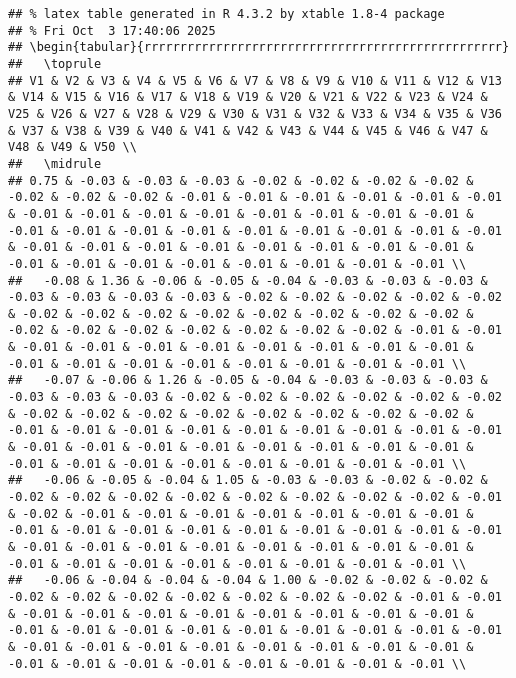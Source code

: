 \documentclass[
]{article}
\begin{document}
\begin{verbatim}
## % latex table generated in R 4.3.2 by xtable 1.8-4 package
## % Fri Oct  3 17:40:06 2025
## \begin{tabular}{rrrrrrrrrrrrrrrrrrrrrrrrrrrrrrrrrrrrrrrrrrrrrrrrrr}
##   \toprule
## V1 & V2 & V3 & V4 & V5 & V6 & V7 & V8 & V9 & V10 & V11 & V12 & V13 & V14 & V15 & V16 & V17 & V18 & V19 & V20 & V21 & V22 & V23 & V24 & V25 & V26 & V27 & V28 & V29 & V30 & V31 & V32 & V33 & V34 & V35 & V36 & V37 & V38 & V39 & V40 & V41 & V42 & V43 & V44 & V45 & V46 & V47 & V48 & V49 & V50 \\ 
##   \midrule
## 0.75 & -0.03 & -0.03 & -0.03 & -0.02 & -0.02 & -0.02 & -0.02 & -0.02 & -0.02 & -0.02 & -0.01 & -0.01 & -0.01 & -0.01 & -0.01 & -0.01 & -0.01 & -0.01 & -0.01 & -0.01 & -0.01 & -0.01 & -0.01 & -0.01 & -0.01 & -0.01 & -0.01 & -0.01 & -0.01 & -0.01 & -0.01 & -0.01 & -0.01 & -0.01 & -0.01 & -0.01 & -0.01 & -0.01 & -0.01 & -0.01 & -0.01 & -0.01 & -0.01 & -0.01 & -0.01 & -0.01 & -0.01 & -0.01 & -0.01 \\ 
##   -0.08 & 1.36 & -0.06 & -0.05 & -0.04 & -0.03 & -0.03 & -0.03 & -0.03 & -0.03 & -0.03 & -0.03 & -0.02 & -0.02 & -0.02 & -0.02 & -0.02 & -0.02 & -0.02 & -0.02 & -0.02 & -0.02 & -0.02 & -0.02 & -0.02 & -0.02 & -0.02 & -0.02 & -0.02 & -0.02 & -0.02 & -0.02 & -0.01 & -0.01 & -0.01 & -0.01 & -0.01 & -0.01 & -0.01 & -0.01 & -0.01 & -0.01 & -0.01 & -0.01 & -0.01 & -0.01 & -0.01 & -0.01 & -0.01 & -0.01 \\ 
##   -0.07 & -0.06 & 1.26 & -0.05 & -0.04 & -0.03 & -0.03 & -0.03 & -0.03 & -0.03 & -0.03 & -0.02 & -0.02 & -0.02 & -0.02 & -0.02 & -0.02 & -0.02 & -0.02 & -0.02 & -0.02 & -0.02 & -0.02 & -0.02 & -0.02 & -0.01 & -0.01 & -0.01 & -0.01 & -0.01 & -0.01 & -0.01 & -0.01 & -0.01 & -0.01 & -0.01 & -0.01 & -0.01 & -0.01 & -0.01 & -0.01 & -0.01 & -0.01 & -0.01 & -0.01 & -0.01 & -0.01 & -0.01 & -0.01 & -0.01 \\ 
##   -0.06 & -0.05 & -0.04 & 1.05 & -0.03 & -0.03 & -0.02 & -0.02 & -0.02 & -0.02 & -0.02 & -0.02 & -0.02 & -0.02 & -0.02 & -0.02 & -0.01 & -0.02 & -0.01 & -0.01 & -0.01 & -0.01 & -0.01 & -0.01 & -0.01 & -0.01 & -0.01 & -0.01 & -0.01 & -0.01 & -0.01 & -0.01 & -0.01 & -0.01 & -0.01 & -0.01 & -0.01 & -0.01 & -0.01 & -0.01 & -0.01 & -0.01 & -0.01 & -0.01 & -0.01 & -0.01 & -0.01 & -0.01 & -0.01 & -0.01 \\ 
##   -0.06 & -0.04 & -0.04 & -0.04 & 1.00 & -0.02 & -0.02 & -0.02 & -0.02 & -0.02 & -0.02 & -0.02 & -0.02 & -0.02 & -0.02 & -0.01 & -0.01 & -0.01 & -0.01 & -0.01 & -0.01 & -0.01 & -0.01 & -0.01 & -0.01 & -0.01 & -0.01 & -0.01 & -0.01 & -0.01 & -0.01 & -0.01 & -0.01 & -0.01 & -0.01 & -0.01 & -0.01 & -0.01 & -0.01 & -0.01 & -0.01 & -0.01 & -0.01 & -0.01 & -0.01 & -0.01 & -0.01 & -0.01 & -0.01 & -0.01 \\ 

\end{verbatim}
\end{document}

